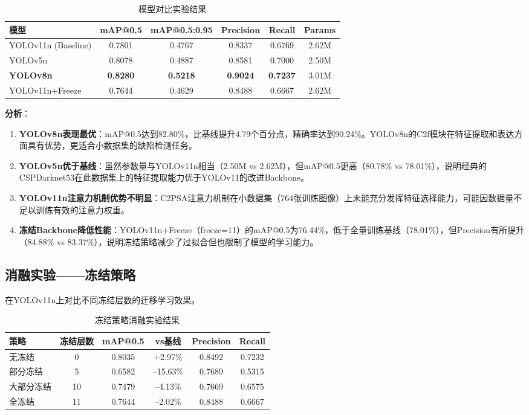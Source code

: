 \documentclass[12pt,a4paper]{article}
\begin{document}
\begin{table}[H]
\centering
\caption{模型对比实验结果}
\label{tab:comparison}
\begin{tabular}{lccccc}
\toprule
模型 & mAP@0.5 & mAP@0.5:0.95 & Precision & Recall & Params \\
\midrule
YOLOv11n (Baseline) & 0.7801 & 0.4767 & 0.8337 & 0.6769 & 2.62M \\
YOLOv5n & 0.8078 & 0.4887 & 0.8581 & 0.7000 & 2.50M \\
\textbf{YOLOv8n} & \textbf{0.8280} & \textbf{0.5218} & \textbf{0.9024} & \textbf{0.7237} & 3.01M \\
YOLOv11n+Freeze & 0.7644 & 0.4629 & 0.8488 & 0.6667 & 2.62M \\
\bottomrule
\end{tabular}
\end{table}

\textbf{分析}：

\begin{enumerate}[noitemsep]
  \item \textbf{YOLOv8n表现最优}：mAP@0.5达到82.80\%，比基线提升4.79个百分点，精确率达到90.24\%。YOLOv8n的C2f模块在特征提取和表达方面具有优势，更适合小数据集的缺陷检测任务。

  \item \textbf{YOLOv5n优于基线}：虽然参数量与YOLOv11n相当（2.50M vs 2.62M），但mAP@0.5更高（80.78\% vs 78.01\%），说明经典的CSPDarknet53在此数据集上的特征提取能力优于YOLOv11的改进Backbone。

  \item \textbf{YOLOv11n注意力机制优势不明显}：C2PSA注意力机制在小数据集（764张训练图像）上未能充分发挥特征选择能力，可能因数据量不足以训练有效的注意力权重。

  \item \textbf{冻结Backbone降低性能}：YOLOv11n+Freeze（freeze=11）的mAP@0.5为76.44\%，低于全量训练基线（78.01\%），但Precision有所提升（84.88\% vs 83.37\%），说明冻结策略减少了过拟合但也限制了模型的学习能力。
\end{enumerate}

\subsection{消融实验——冻结策略}

在YOLOv11n上对比不同冻结层数的迁移学习效果。

\begin{table}[H]
\centering
\caption{冻结策略消融实验结果}
\label{tab:ablation}
\begin{tabular}{lccccc}
\toprule
策略 & 冻结层数 & mAP@0.5 & vs基线 & Precision & Recall \\
\midrule
无冻结 & 0 & 0.8035 & +2.97\% & 0.8492 & 0.7232 \\
部分冻结 & 5 & 0.6582 & --15.63\% & 0.7689 & 0.5315 \\
大部分冻结 & 10 & 0.7479 & --4.13\% & 0.7669 & 0.6575 \\
全冻结 & 11 & 0.7644 & --2.02\% & 0.8488 & 0.6667 \\
\bottomrule
\end{tabular}
\end{table}
\end{document}
